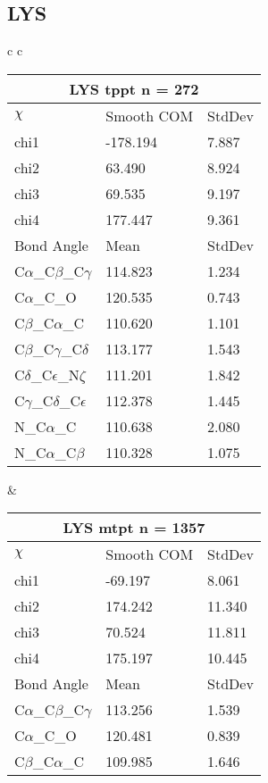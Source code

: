 \newpage
\subsection{LYS}

\begin{longtable}{ c c }

  \begin{tabular}{ l l l }
  \toprule
  \multicolumn{3}{c}{LYS \textbf{tppt} n = 272} \\ \toprule
  $\chi$       & Smooth COM & StdDev \\ \midrule
  chi1 & -178.194 & 7.887 \\ 
  chi2 & 63.490 & 8.924 \\ 
  chi3 & 69.535 & 9.197 \\ 
  chi4 & 177.447 & 9.361 \\ \midrule
  Bond Angle   & Mean     & StdDev \\ \midrule
  C$\alpha$\_C$\beta$\_C$\gamma$ & 114.823 & 1.234\\
  C$\alpha$\_C\_O & 120.535 & 0.743\\
  C$\beta$\_C$\alpha$\_C & 110.620 & 1.101\\
  C$\beta$\_C$\gamma$\_C$\delta$ & 113.177 & 1.543\\
  C$\delta$\_C$\epsilon$\_N$\zeta$ & 111.201 & 1.842\\
  C$\gamma$\_C$\delta$\_C$\epsilon$ & 112.378 & 1.445\\
  N\_C$\alpha$\_C & 110.638 & 2.080\\
  N\_C$\alpha$\_C$\beta$ & 110.328 & 1.075\\
  \bottomrule
  \end{tabular}
  &
  \begin{tabular}{ l l l }
  \toprule
  \multicolumn{3}{c}{LYS \textbf{mtpt} n = 1357} \\ \toprule
  $\chi$       & Smooth COM & StdDev \\ \midrule
  chi1 & -69.197 & 8.061 \\ 
  chi2 & 174.242 & 11.340 \\ 
  chi3 & 70.524 & 11.811 \\ 
  chi4 & 175.197 & 10.445 \\ \midrule
  Bond Angle   & Mean     & StdDev \\ \midrule
  C$\alpha$\_C$\beta$\_C$\gamma$ & 113.256 & 1.539\\
  C$\alpha$\_C\_O & 120.481 & 0.839\\
  C$\beta$\_C$\alpha$\_C & 109.985 & 1.646\\

\end{tabular}
\end{longtable}
